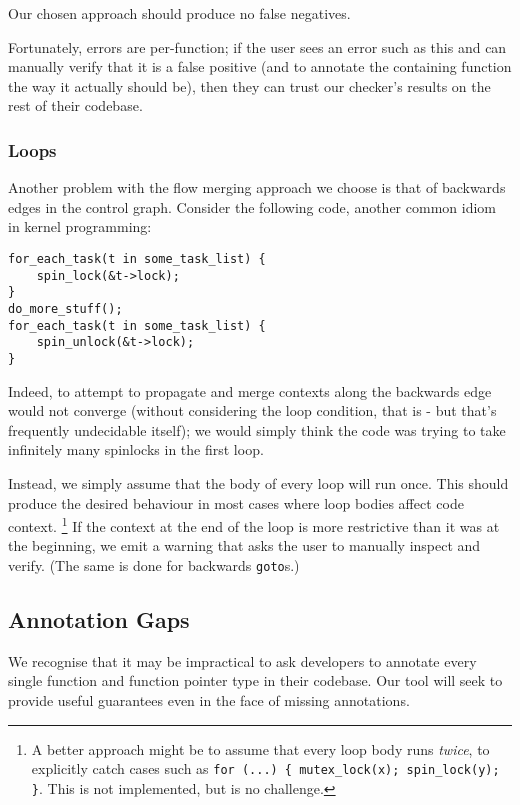 \documentclass{article}
\begin{document}
Our chosen approach should produce no false negatives.

Fortunately, errors are per-function; if the user sees an error such as this and can manually verify that it is a false positive (and to annotate the containing function the way it actually should be), then they can trust our checker's results on the rest of their codebase.

\subsubsection{Loops}

Another problem with the flow merging approach we choose is that of backwards edges in the control graph. Consider the following code, another common idiom in kernel programming:

\begin{verbatim}
for_each_task(t in some_task_list) {
    spin_lock(&t->lock);
}
do_more_stuff();
for_each_task(t in some_task_list) {
    spin_unlock(&t->lock);
}
\end{verbatim}

Indeed, to attempt to propagate and merge contexts along the backwards edge would not converge (without considering the loop condition, that is - but that's frequently undecidable itself); we would simply think the code was trying to take infinitely many spinlocks in the first loop.

Instead, we simply assume that the body of every loop will run once. This should produce the desired behaviour in most cases where loop bodies affect code context.
\footnote{A better approach might be to assume that every loop body runs {\em twice}, to explicitly catch cases such as \texttt{for (...) \{ mutex\_lock(x); spin\_lock(y); \}}. This is not implemented, but is no challenge.}
If the context at the end of the loop is more restrictive than it was at the beginning, we emit a warning that asks the user to manually inspect and verify. (The same is done for backwards \texttt{goto}s.)

\subsection{Annotation Gaps}

We recognise that it may be impractical to ask developers to annotate every single function and function pointer type in their codebase.
Our tool will seek to provide useful guarantees even in the face of missing annotations.
\end{document}

